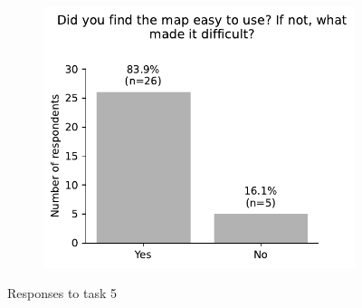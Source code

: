 \begin{appendices}
\begin{figure}[H]
\begin{subfigure}[b]{0.5\textwidth}
	\end{subfigure}%
	\newline
	\begin{subfigure}[b]{0.5\textwidth}
		\includegraphics[width=\textwidth]{visual/figures/survey/9.pdf}
	\end{subfigure}%
	\newline
	Responses to task 5
\end{figure}


\end{appendices}
